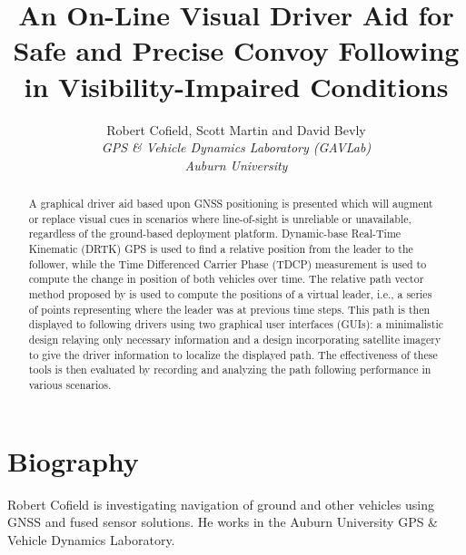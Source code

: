 \documentclass[twocolumn,10pt]{article}
\begin{document}

\title{\textbf{An On-Line Visual Driver Aid for Safe and Precise Convoy Following in Visibility-Impaired Conditions}}
\author{
  Robert Cofield, Scott Martin and David Bevly \\
  \em{GPS \& Vehicle Dynamics Laboratory (GAVLab)} \\
  \em{Auburn University} \\
}
\date{} %
\maketitle


\begin{abstract}

  A graphical driver aid based upon GNSS positioning is presented which will augment or replace visual cues in scenarios where line-of-sight is unreliable or unavailable, regardless of the ground-based deployment platform.
  Dynamic-base Real-Time Kinematic (DRTK) GPS is used to find a relative position from the leader to the follower, while the Time Differenced Carrier Phase (TDCP) measurement is used to compute the change in position of both vehicles over time.
  The relative path vector method proposed by \cite{travisdiss} is used to compute the positions of a virtual leader, i.e., a series of points representing where the leader was at previous time steps.
  This path is then displayed to following drivers using two graphical user interfaces (GUIs): a minimalistic design relaying only necessary information and a design incorporating satellite imagery to give the driver information to localize the displayed path.
  The effectiveness of these tools is then evaluated by recording and analyzing the path following performance in various scenarios.

\end{abstract}


\section*{Biography}

  Robert Cofield is investigating navigation of ground and other vehicles using GNSS and fused sensor solutions.  He works in the Auburn University GPS \& Vehicle Dynamics Laboratory.
\end{document}
